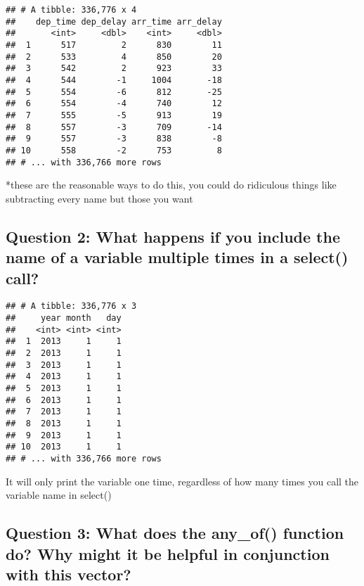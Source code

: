 \documentclass[
]{book}
\newenvironment{Shaded}{\begin{snugshade}}{\end{snugshade}}
\newcommand{\KeywordTok}[1]{\textcolor[rgb]{0.13,0.29,0.53}{\textbf{#1}}}
\newcommand{\NormalTok}[1]{#1}
\newcommand{\OperatorTok}[1]{\textcolor[rgb]{0.81,0.36,0.00}{\textbf{#1}}}
\newcommand{\StringTok}[1]{\textcolor[rgb]{0.31,0.60,0.02}{#1}}
\begin{document}
\begin{verbatim}
## # A tibble: 336,776 x 4
##    dep_time dep_delay arr_time arr_delay
##       <int>     <dbl>    <int>     <dbl>
##  1      517         2      830        11
##  2      533         4      850        20
##  3      542         2      923        33
##  4      544        -1     1004       -18
##  5      554        -6      812       -25
##  6      554        -4      740        12
##  7      555        -5      913        19
##  8      557        -3      709       -14
##  9      557        -3      838        -8
## 10      558        -2      753         8
## # ... with 336,766 more rows
\end{verbatim}

*these are the reasonable ways to do this, you could do ridiculous things like subtracting every name but those you want

\hypertarget{question-2-what-happens-if-you-include-the-name-of-a-variable-multiple-times-in-a-select-call}{%
\subsection{Question 2: What happens if you include the name of a variable multiple times in a select() call?}\label{question-2-what-happens-if-you-include-the-name-of-a-variable-multiple-times-in-a-select-call}}

\begin{Shaded}
\end{Shaded}

\begin{verbatim}
## # A tibble: 336,776 x 3
##     year month   day
##    <int> <int> <int>
##  1  2013     1     1
##  2  2013     1     1
##  3  2013     1     1
##  4  2013     1     1
##  5  2013     1     1
##  6  2013     1     1
##  7  2013     1     1
##  8  2013     1     1
##  9  2013     1     1
## 10  2013     1     1
## # ... with 336,766 more rows
\end{verbatim}

It will only print the variable one time, regardless of how many times you call the variable name in select()

\hypertarget{question-3-what-does-the-any_of-function-do-why-might-it-be-helpful-in-conjunction-with-this-vector}{%
\subsection{Question 3: What does the any\_of() function do? Why might it be helpful in conjunction with this vector?}\label{question-3-what-does-the-any_of-function-do-why-might-it-be-helpful-in-conjunction-with-this-vector}}
\end{document}
